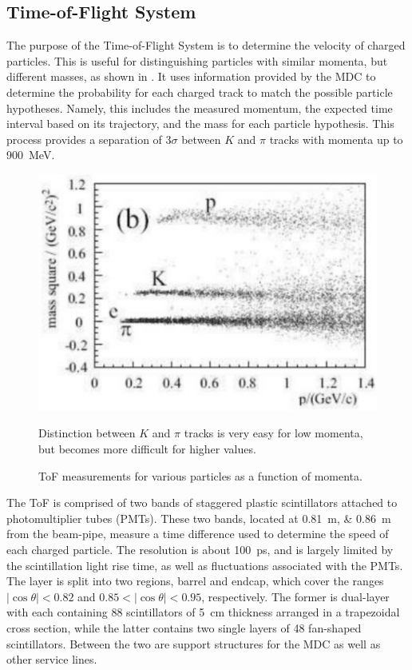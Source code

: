 \subsection{Time-of-Flight System}
\label{ssec:detector_tof}

The purpose of the Time-of-Flight System is to determine the velocity of charged particles.
This is useful for distinguishing particles with similar momenta, but different masses, as shown in .
It uses information provided by the MDC to determine the probability for each charged track to match the possible particle hypotheses.
Namely, this includes the measured momentum, the expected time interval based on its trajectory, and the mass for each particle hypothesis.
This process provides a separation of $3\sigma$ between $K$ and $\pi$ tracks with momenta up to \SI{900}{\MeV}.


\begin{figure}[H]
\centering
\includegraphics[scale=0.60]{figures/images/ToF.pdf}
\caption{ToF measurements for various particles as a function of momenta.}
{Distinction between $K$ and $\pi$ tracks is very easy for low momenta, but becomes more difficult for higher values.}
\label{fig:ToF}
\end{figure}

The ToF is comprised of two bands of staggered plastic scintillators attached to photomultiplier tubes (PMTs).
These two bands, located at \SIlist{0.81;0.86}{\m} from the beam-pipe, measure a time difference used to determine the speed of each charged particle.
The resolution is about \SI{100}{\ps}, and is largely limited by the scintillation light rise time, as well as fluctuations associated with the PMTs.
The layer is split into two regions, barrel and endcap, which cover the ranges $|\cos\theta| < 0.82$ and $0.85 < |\cos\theta| < 0.95$, respectively.
The former is dual-layer with each containing 88 scintillators of \SI{5}{\cm} thickness arranged in a trapezoidal cross section, while the latter contains two single layers of 48 fan-shaped scintillators.
Between the two are support structures for the MDC as well as other service lines.


